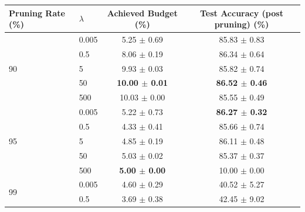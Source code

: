 \begin{table}[tbp]
  \centering
  \begin{center}
    \begin{tabular}{llcc}
      \toprule
      \textbf{Pruning Rate} (\%) & \textbf{$\lambda$}                         & \textbf{Achieved Budget} (\%)
                                 & \textbf{Test Accuracy (post pruning)} (\%)                                                             \\
      \midrule
      \multirow{5}{*}{90}        & 0.005                                      & 5.25 $\pm$ 0.69               & 85.83 $\pm$ 0.83          \\
                                 & 0.5                                        & 8.06 $\pm$ 0.19               & 86.34 $\pm$ 0.64          \\
                                 & 5                                          & 9.93 $\pm$ 0.03               & 85.82 $\pm$ 0.74          \\
                                 & 50                                         & \textbf{10.00 $\pm$ 0.01}     & \textbf{86.52 $\pm$ 0.46} \\
                                 & 500                                        & 10.03 $\pm$ 0.00              & 85.55 $\pm$ 0.49          \\
      \midrule
      \multirow{5}{*}{95}        & 0.005                                      & 5.22 $\pm$ 0.73               & \textbf{86.27 $\pm$ 0.32} \\
                                 & 0.5                                        & 4.33 $\pm$ 0.41               & 85.66 $\pm$ 0.74          \\
                                 & 5                                          & 4.85 $\pm$ 0.19               & 86.11 $\pm$ 0.48          \\
                                 & 50                                         & 5.03 $\pm$ 0.02               & 85.37 $\pm$ 0.37          \\
                                 & 500                                        & \textbf{5.00 $\pm$ 0.00}      & 10.00 $\pm$ 0.00          \\
      \midrule
      \multirow{5}{*}{99}        & 0.005                                      & 4.60 $\pm$ 0.29               & 40.52 $\pm$ 5.27          \\
                                 & 0.5                                        & 3.69 $\pm$ 0.38               & 42.45 $\pm$ 9.02          \\

\end{tabular}
\end{center}
\end{table}
